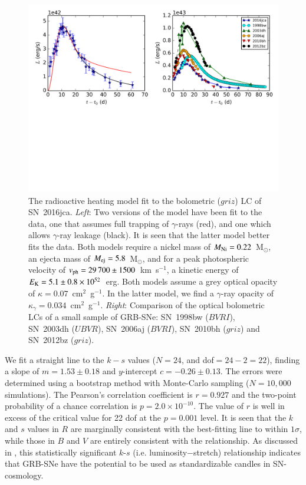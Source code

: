 \documentclass[traditabstract,longauth]{aa}
\begin{document}
\begin{figure}
   \includegraphics[width=\hsize, trim={0 200pt 0 0}]{Fig12_Arnett-eps-converted-to.pdf}
      \caption{The radioactive heating model \citep{Arnett1982} fit to the bolometric ($griz$) LC of SN~2016jca.  \textit{Left}: Two versions of the model have been fit to the data, one that assumes full trapping of $\gamma$-rays (red), and one which allows $\gamma$-ray leakage (black).  It is seen that the latter model better fits the data.  Both models require a nickel mass of $M_{\rm Ni} = 0.22$~M$_{\odot}$, an ejecta mass of $M_{\rm ej} = 5.8$~M$_{\odot}$, and for a peak photospheric velocity of $v_{\rm ph} = 29\,700\pm1500$~km~s$^{-1}$, a kinetic energy of $E_{\rm K} = 5.1\pm0.8\times10^{52}$~erg.  Both models assume a grey optical opacity of $\kappa = 0.07$~cm$^2$~g$^{-1}$.  In the latter model, we find a $\gamma$-ray opacity of $\kappa_{\gamma} = 0.034$~cm$^2$~g$^{-1}$. \textit{Right}: Comparison of the optical bolometric LCs of a small sample of GRB-SNe: SN~1998bw ($BVRI$), SN~2003dh ($UBVR$), SN~2006aj ($BVRI$), SN~2010bh ($griz$) and SN~2012bz ($griz$).}
   \label{FigArnett}
\end{figure}


We fit a straight line to the $k-s$ values ($N=24$, and dof$ = 24-2 = 22$), finding a slope of $m=1.53\pm0.18$ and $y$-intercept $c=-0.26\pm0.13$.  The errors were determined using a bootstrap method with Monte-Carlo sampling ($N=10,000$ simulations).  The Pearson's correlation coefficient is $r=0.927$ and the two-point probability of a chance correlation is $p=2.0\times10^{-10}$.  The value of $r$ is well in excess of the critical value for 22 dof at the $p=0.001$ level.  It is seen that the $k$ and $s$ values in $R$ are marginally consistent with the best-fitting line to within $1\sigma$, while those in $B$ and $V$ are entirely consistent with the relationship.   As discussed in \citet{Cano14}, this statistically significant $k$-$s$ (i.e. luminosity$-$stretch) relationship indicates that GRB-SNe have the potential to be used as standardizable candles \citep{CJG14,LiHjorth2014} in SN-cosmology.
   
\end{document}
